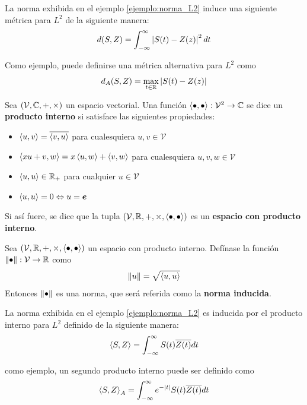 \begin{ejemplo}
La norma exhibida en el ejemplo \ref{ejemplo:norma_L2} induce una siguiente métrica para $L^{2}$ de la siguiente manera:
\begin{equation}
d(S,Z) = \int_{-\infty}^{\infty} \left| S(t) - Z(z) \right|^{2} dt
\end{equation}

Como ejemplo, puede definirse una métrica alternativa para $L^{2}$ como
\begin{equation}
d_A(S,Z) = \max_{t \in \mathbb{R}} \left| S(t) - Z(z) \right|
\end{equation}
\end{ejemplo}

\begin{definicion}
Sea $(\mathcal{V},\mathbb{C},+,\times)$ un espacio vectorial. Una función $\left\langle \bullet,\bullet \right\rangle : \mathcal{V}^{2}\rightarrow \mathbb{C}$ se dice un \textbf{producto interno} si satisface las siguientes propiedades:
\begin{itemize}
\item $\left\langle u,v \right\rangle = \overline{\left\langle v,u \right\rangle}$ para cualesquiera $u,v \in \mathcal{V}$
\item $\left\langle x u + v, w \right\rangle = x \left\langle u,w \right\rangle + \left\langle v,w \right\rangle$ para cualesquiera $u,v,w \in \mathcal{V}$
\item $\left\langle u,u \right\rangle \in \mathbb{R}_+$ para cualquier $u \in \mathcal{V}$
\item $\left\langle u,u \right\rangle = 0 \Leftrightarrow u = \boldsymbol{e}$
\end{itemize}
Si así fuere, se dice que la tupla $(\mathcal{V},\mathbb{R},+,\times, \left\langle \bullet,\bullet \right\rangle)$ es un \textbf{espacio con producto interno}.
\end{definicion}

\begin{proposicion}
Sea $(\mathcal{V},\mathbb{R},+,\times, \left\langle \bullet,\bullet \right\rangle)$ un espacio con producto interno. Defínase la función $\left\Vert \bullet \right\Vert: \mathcal{V} \rightarrow \mathbb{R}$ como
\begin{equation}
\left\Vert u \right\Vert = \sqrt{\left\langle u,u \right\rangle}
\end{equation}
Entonces $\left\Vert \bullet \right\Vert$ es una norma, que será referida como la \textbf{norma inducida}.
\end{proposicion}

\begin{ejemplo}
La norma exhibida en el ejemplo \ref{ejemplo:norma_L2} es inducida por el producto interno para $L^{2}$ definido de la siguiente manera:
\begin{equation}
\left\langle S,Z \right\rangle = \int_{-\infty}^{\infty} S(t) \overline{Z(t)} dt
\end{equation}

como ejemplo, un segundo producto interno puede ser definido como
\begin{equation}
\left\langle S,Z \right\rangle_A = \int_{-\infty}^{\infty} e^{-\left| t \right|} S(t) \overline{Z(t)} dt
\end{equation}
\end{ejemplo}

